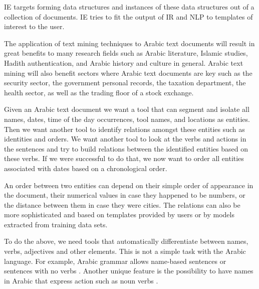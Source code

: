 \documentclass[12pt]{article}
\newcommand{\noTrNoVocRL}[1]{\novocalize\transfalse\RL{#1}\transtrue\vocalize}
\begin{document}
IE targets forming data structures and instances of these 
data structures out of a collection of documents.
IE tries to fit the output of IR and NLP to templates of 
interest to the user.


The application of text mining techniques to Arabic text documents 
will result in great benefits to many research fields such as 
Arabic literature,
Islamic studies, Hadith authentication, and Arabic history and 
culture in general.
Arabic text mining will also benefit sectors where Arabic text 
documents are key such as the security sector,
the government personal records,
the taxation department,
the health sector,
as well as the trading floor of a stock exchange.
 
Given an Arabic text document we want a tool that can segment 
and isolate all names, dates, time of the day occurrences,
tool names, and locations as entities.
Then we want another tool to identify relations amongst 
these entities such as identities and orders.
We want another tool to look at the verbs and actions in 
the sentences and try to build relations between the identified 
entities based on these verbs.
If we were successful to do that,
we now want to order all entities associated with dates based 
on a chronological order.

An order between two entities can depend on 
their simple order of appearance in the document, their 
numerical values in case they happened to be numbers, or
the distance between them in case they were cities. 
The relations can also be more sophisticated and 
based on templates provided by users or by 
models extracted from training data sets. 

To do the above, 
we need tools that automatically differentiate between 
names, verbs, adjectives and other elements.
This is not a simple task with the Arabic language.
For example, Arabic grammar allows name-based sentences 
or sentences with no verbs \noTrNoVocRL{^gml ismiyT} .
Another unique feature is the possibility to have names in Arabic 
that express action such as noun verbs 
\noTrNoVocRL{ism f`l, f-a`l $\ldots$}.
\end{document}
